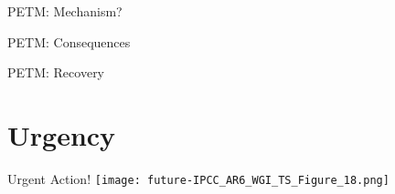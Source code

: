 \begin{frame}{PETM: Mechanism?}

\end{frame}

\begin{frame}{PETM: Consequences}

\end{frame}

\begin{frame}{PETM: Recovery}

\end{frame}

\section{Urgency}

\begin{frame}{Urgent Action!}
    \centering
    \texttt{[image: future-IPCC\_AR6\_WGI\_TS\_Figure\_18.png]}
\end{frame}







